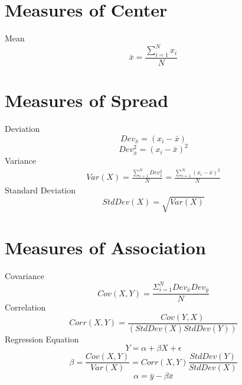 \documentclass[addpoints,12pt]{exam}
\begin{document}
\section{Measures of Center}
Mean
\begin{equation*}
\bar{x}=\frac{\sum\limits_{i=1}^{N} x_i }{N} 
\end{equation*}
\section{Measures of Spread}
Deviation
\begin{equation*}
Dev_{\bar{x}}=(x_i-\bar{x}) 
\end{equation*}
\begin{equation*}
Dev_{\bar{x}}^2=(x_i-\bar{x})^2 
\end{equation*}
Variance
\begin{multline*}
Var(X)=\frac{\sum_{i=1}^{N} Dev_{\bar{x}}^2}{N}=\frac{\sum_{i=1}^{N} (x_i-\bar{x})^2}{N}
\end{multline*}
Standard Deviation
\begin{equation*}
StdDev(X)=\sqrt{Var(X)} 
\end{equation*}
\section{Measures of Association}
Covariance
\begin{equation*}
Cov(X,Y)=\frac{\Sigma_{i=1}^{N} Dev_{\bar{x}}Dev_{\bar{y}}}{N}
\end{equation*}
Correlation
\begin{equation*}
Corr(X,Y)=\frac{Cov(Y,X)}{(StdDev(X)StdDev(Y))}
\end{equation*}
Regression Equation
\begin{equation*}
Y=\alpha + \beta X + \epsilon
\end{equation*}
\begin{equation*}
{\beta}=\frac{Cov(X,Y)}{Var(X)}=Corr(X,Y)\frac{StdDev(Y)}{StdDev(X)}
\end{equation*}
\begin{equation*}
{\alpha}=\bar{y}-{\beta}\bar{x}
\end{equation*}
\end{document}
